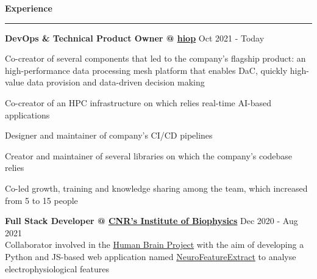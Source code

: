 \documentclass[11pt,letterpaper]{article}
\begin{document}
\begin{justify}
            {\large \textbf{Experience} \strut}
      \vspace{0.03cm}
      \hrule
      \begin{itemize}[label={}, leftmargin=0pt]
            \begin{item}
                  \textbf{DevOps \& Technical Product Owner @ \href{https://hiop.io/}{hiop}}
                  \hfill
                  Oct 2021 - Today
                  \vspace{-0.15cm}
                  \begin{itemize}[label={$\bullet$}, leftmargin=12.5pt, noitemsep]
                        \begin{item}
                              Co-creator of several components that led to the company's flagship product: an high-performance data processing mesh platform that enables DaC, quickly high-value data provision and data-driven decision making
                        \end{item}
                        \begin{item}
                              Co-creator of an HPC infrastructure on which relies real-time AI-based applications
                        \end{item}
                        \begin{item}
                              Designer and maintainer of company's CI/CD pipelines
                        \end{item}
                        \begin{item}
                              Creator and maintainer of several libraries on which the company's codebase relies
                        \end{item}
                        \begin{item}
                              Co-led growth, training and knowledge sharing among the team, which increased from 5 to 15 people
                        \end{item}
                  \end{itemize}
            \end{item}
            \begin{item}
                  \textbf{Full Stack Developer @ \href{https://www.ibf.cnr.it}{CNR’s Institute of Biophysics}}
                  \hfill
                  Dec 2020 - Aug 2021
                  \vspace{0.05cm}
                  \\
                  Collaborator involved in the \href{https://www.humanbrainproject.eu/en/}{Human Brain Project} with the aim of developing a Python and JS-based web application named \href{https://hbp-bsp-hhnb.cineca.it/efelg/}{NeuroFeatureExtract} to analyse electrophysiological features

\end{item}
\end{itemize}
\end{justify}
\end{document}
